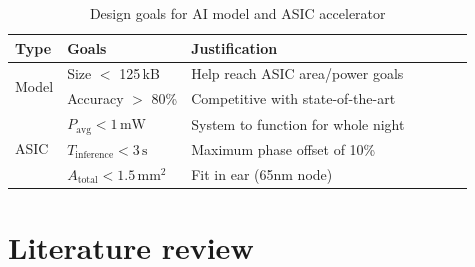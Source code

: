 \documentclass[12pt, hidelinks]{article}
\begin{document}
    \begin{table}
        \centering
        \renewcommand{\arraystretch}{1.2} %
        \setlength{\arrayrulewidth}{1.5pt} %
        \caption{Design goals for AI model and ASIC accelerator}
        \begin{tabular}{@{} *7l @{}}
            \toprule
            Type        & Goals                                     & Justification &&&  \\\midrule
            \multirow{2}{*}{Model}
                        & Size $<$ 125\,kB                          & Help reach ASIC area/power goals \\
                        & Accuracy $>$ 80\%                         & Competitive with state-of-the-art \\ \bottomrule
            \multirow{3}{*}{ASIC}
                        & $P_{\mathrm{avg}} < 1\,\mathrm{mW}$       & System to function for whole night \\
                        & $T_{\mathrm{inference}} < 3\,\mathrm{s}$  & Maximum phase offset of 10\% \\
                        & $A_{\mathrm{total}} < 1.5\,\mathrm{mm}^2$ & Fit in ear (65nm node) \\
            \hline
        \end{tabular}
        \label{tab:design_goals}
    \end{table}

    \section{Literature review}
\end{document}
